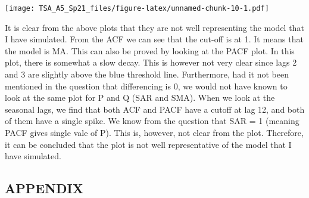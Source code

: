 \documentclass[
]{article}
\begin{document}
\texttt{[image: TSA\_A5\_Sp21\_files/figure-latex/unnamed-chunk-10-1.pdf]}

It is clear from the above plots that they are not well representing the
model that I have simulated. From the ACF we can see that the cut-off is
at 1. It means that the model is MA. This can also be proved by looking
at the PACF plot. In this plot, there is somewhat a slow decay. This is
however not very clear since lags 2 and 3 are slightly above the blue
threshold line. Furthermore, had it not been mentioned in the question
that differencing is 0, we would not have known to look at the same plot
for P and Q (SAR and SMA). When we look at the seasonal lags, we find
that both ACF and PACF have a cutoff at lag 12, and both of them have a
single spike. We know from the question that SAR = 1 (meaning PACF gives
single vale of P). This is, however, not clear from the plot. Therefore,
it can be concluded that the plot is not well representative of the
model that I have simulated.

\hypertarget{appendix}{%
\subsection{APPENDIX}\label{appendix}}
\end{document}
